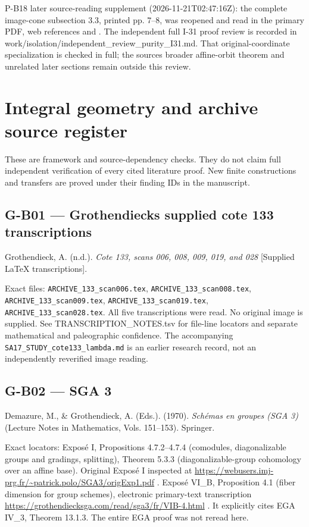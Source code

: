 \documentclass[11pt,a4paper]{article}
\theoremstyle{definition}\newtheorem{definition}{Definition}
\begin{document}
P-B18 later source-reading supplement (2026-11-21T02:47:16Z): the
complete image-cone subsection 3.3, printed pp. 7--8, was reopened and
read in the primary PDF, web references and . The independent full I-31
proof review is recorded in
work/isolation/independent\_review\_purity\_I31.md. That
original-coordinate specialization is checked in full; the
source\textquotesingle s broader affine-orbit theorem and unrelated
later sections remain outside this review.
\section{Integral geometry and archive source
register}\label{integral-geometry-and-archive-source-register}

These are framework and source-dependency checks. They do not claim full
independent verification of every cited literature proof. New finite
constructions and transfers are proved under their finding IDs in the
manuscript.

\subsection{G-B01 --- Grothendieck\textquotesingle s supplied cote 133
transcriptions}\label{g-b01--grothendiecks-supplied-cote-133-transcriptions}

Grothendieck, A. (n.d.). \emph{Cote 133, scans 006, 008, 009, 019, and
028} {[}Supplied LaTeX transcriptions{]}.

Exact files: \nolinkurl{ARCHIVE_133_scan006.tex},
\nolinkurl{ARCHIVE_133_scan008.tex}, \nolinkurl{ARCHIVE_133_scan009.tex},
\nolinkurl{ARCHIVE_133_scan019.tex}, \nolinkurl{ARCHIVE_133_scan028.tex}.
All five transcriptions were read. No original image is supplied. See
TRANSCRIPTION\_NOTES.tsv for file-line locators and separate
mathematical and paleographic confidence. The accompanying
\nolinkurl{SA17_STUDY_cote133_lambda.md} is an earlier research record,
not an independently reverified image reading.

\subsection{G-B02 --- SGA 3}\label{g-b02--sga-3}

Demazure, M., \& Grothendieck, A. (Eds.). (1970). \emph{Schémas en
groupes (SGA 3)} (Lecture Notes in Mathematics, Vols. 151--153).
Springer.

Exact locators: Exposé I, Propositions 4.7.2--4.7.4 (comodules,
diagonalizable groups and gradings, splitting), Theorem 5.3.3
(diagonalizable-group cohomology over an affine base). Original Exposé I
inspected at
\url{https://webusers.imj-prg.fr/~patrick.polo/SGA3/origExp1.pdf} .
Exposé VI\_B, Proposition 4.1 (fiber dimension for group schemes),
electronic primary-text transcription
\url{https://grothendiecksga.com/read/sga3/fr/VIB-4.html} . It
explicitly cites EGA IV\_3, Theorem 13.1.3. The entire EGA proof was not
reread here.
\end{document}
